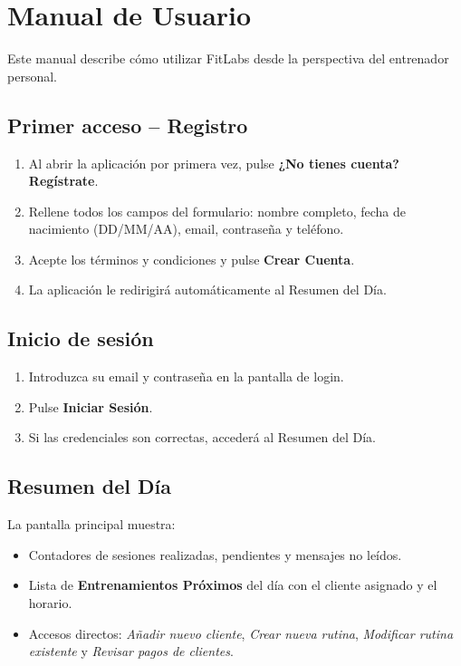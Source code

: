 \chapter{Manual de Usuario}
\label{anexo:usuario}

Este manual describe cómo utilizar FitLabs desde la perspectiva del entrenador personal.

\section{Primer acceso -- Registro}

\begin{enumerate}
  \item Al abrir la aplicación por primera vez, pulse \textbf{¿No tienes cuenta? Regístrate}.
  \item Rellene todos los campos del formulario: nombre completo, fecha de nacimiento (DD/MM/AA), email, contraseña y teléfono.
  \item Acepte los términos y condiciones y pulse \textbf{Crear Cuenta}.
  \item La aplicación le redirigirá automáticamente al Resumen del Día.
\end{enumerate}

\section{Inicio de sesión}

\begin{enumerate}
  \item Introduzca su email y contraseña en la pantalla de login.
  \item Pulse \textbf{Iniciar Sesión}.
  \item Si las credenciales son correctas, accederá al Resumen del Día.
\end{enumerate}

\section{Resumen del Día}

La pantalla principal muestra:
\begin{itemize}
  \item Contadores de sesiones realizadas, pendientes y mensajes no leídos.
  \item Lista de \textbf{Entrenamientos Próximos} del día con el cliente asignado y el horario.
  \item Accesos directos: \textit{Añadir nuevo cliente}, \textit{Crear nueva rutina}, \textit{Modificar rutina existente} y \textit{Revisar pagos de clientes}.
\end{itemize}

